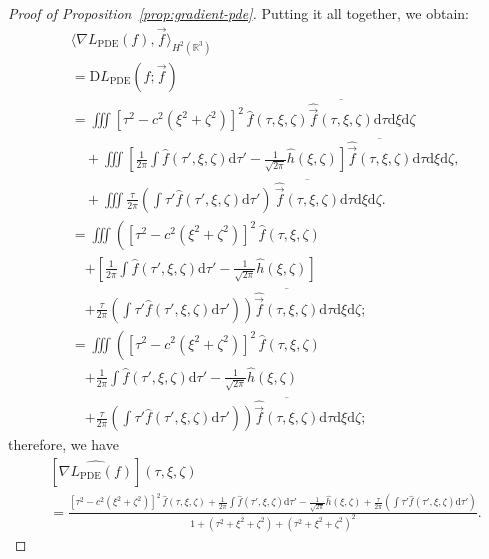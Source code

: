 \documentclass{article}
\newcommand{\R}{\mathbb{R}}
\newcommand{\D}{\mathrm{D}}
\newcommand{\dif}{\mathrm{d}}
\begin{document}
\begin{proof}[Proof of Proposition~\ref{prop:gradient-pde}]
    Putting it all together, we obtain:
    \begin{align*}
        & \langle \nabla L_\mathrm{PDE}(f), \vec{f} \rangle_{H^2(\R^3)}
        \\ &= \D L_\mathrm{PDE}(f; \vec{f})
        \\ &= \iiint \left[ \tau^2 - c^2 \left( \xi^2 + \zeta^2 \right) \right]^2 \, \widehat{f}(\tau, \xi, \zeta) \overline{\widehat{\vec{f}}(\tau, \xi, \zeta)} \dif \tau \dif \xi \dif \zeta
            \\ &\quad + \iiint \left[ \frac{1}{2\pi} \int \widehat{f}(\tau', \xi, \zeta) \dif\tau' - \frac{1}{\sqrt{2\pi}} \widehat{h}(\xi, \zeta) \right] \overline{\widehat{\vec{f}}(\tau, \xi, \zeta)} \dif \tau \dif \xi \dif \zeta,
            \\ &\quad + \iiint \frac{\tau}{2\pi} \left( \int \tau' \widehat{f}(\tau', \xi, \zeta) \dif \tau' \right) \, \overline{\widehat{\vec{f}}(\tau, \xi, \zeta)} \dif \tau \dif \xi \dif \zeta.
        \\ &= \iiint \left(
            \left[ \tau^2 - c^2 \left( \xi^2 + \zeta^2 \right) \right]^2 \, \widehat{f}(\tau, \xi, \zeta) \right.
            \\ &\quad \left. + \left[ \frac{1}{2\pi} \int \widehat{f}(\tau', \xi, \zeta) \dif\tau' - \frac{1}{\sqrt{2\pi}} \widehat{h}(\xi, \zeta) \right] \right.
            \\ &\quad \left. + \frac{\tau}{2\pi} \left( \int \tau' \widehat{f}(\tau', \xi, \zeta) \dif \tau' \right)
        \right) \overline{\widehat{\vec{f}}(\tau, \xi, \zeta)} \dif \tau \dif \xi \dif \zeta;
        \\ &= \iiint \left(
            \left[ \tau^2 - c^2 \left( \xi^2 + \zeta^2 \right) \right]^2 \, \widehat{f}(\tau, \xi, \zeta) \right.
            \\ &\quad \left. + \frac{1}{2\pi} \int \widehat{f}(\tau', \xi, \zeta) \dif\tau' - \frac{1}{\sqrt{2\pi}} \widehat{h}(\xi, \zeta) \right.
            \\ &\quad \left. + \frac{\tau}{2\pi} \left( \int \tau' \widehat{f}(\tau', \xi, \zeta) \dif \tau' \right)
        \right) \overline{\widehat{\vec{f}}(\tau, \xi, \zeta)} \dif \tau \dif \xi \dif \zeta;
    \end{align*}
    therefore, we have
    {\small
    \begin{align*}
        & [ \widehat{\nabla L_\mathrm{PDE}(f)} ](\tau, \xi, \zeta)
        \\ &= \frac{
            \left[ \tau^2 - c^2 \left( \xi^2 + \zeta^2 \right) \right]^2 \, \widehat{f}(\tau, \xi, \zeta)
            + \frac{1}{2\pi} \int \widehat{f}(\tau', \xi, \zeta) \dif\tau' - \frac{1}{\sqrt{2\pi}} \widehat{h}(\xi, \zeta)
            + \frac{\tau}{2\pi} \left( \int \tau' \widehat{f}(\tau', \xi, \zeta) \dif \tau' \right)
        }{1 + (\tau^2 + \xi^2 + \zeta^2) + (\tau^2 + \xi^2 + \zeta^2)^2}.
    \end{align*}
    }
\end{proof}
\end{document}
